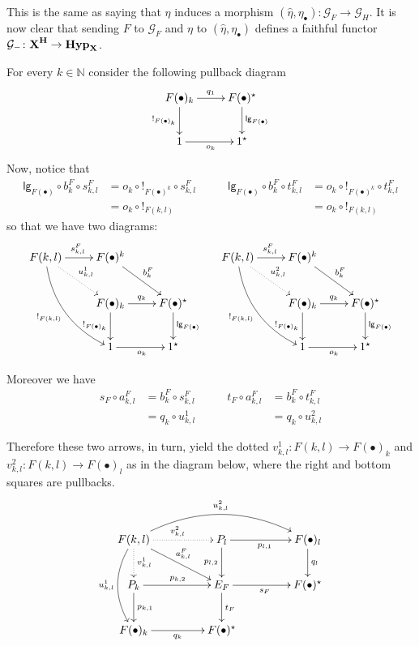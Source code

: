 \documentclass[runningheads,envcountsect]{llncs}
\newcommand{\lgh}{\mathsf{lg}}
\def\X{\textbf {\textup{X}}}
\newcommand{\catname}[1]{\textbf{\textup{#1}}}
\newcommand{\hyp}{\catname{Hyp}}
\begin{document}
This is the same as saying that $\eta$ induces a morphism $(\hat{\eta}, \eta_{\bullet})\colon \mathcal{G}_F\to \mathcal{G}_H$. It is now clear that sending $F$ to $\mathcal{G}_F$ and $\eta$ to $(\hat{\eta}, \eta_{\bullet})$ defines a faithful functor $\mathcal{G}_{-}\colon \catname{\X}^{\catname{H}}\to \hyp_\X$.

\begin{remark}\label{rem:utile}
For every $k\in \mathbb{N}$ consider the following pullback diagram	
	\[\xymatrix{F(\bullet)_k  \ar[r]^{q_1} \ar[d]_{!_{F(\bullet)_k}}& F(\bullet)^\star \ar[d]^{\lgh_{F(\bullet)}} \\ 1 \ar[r]_{o_k} & 1^\star}\]
	Now, notice that 
	\[\begin{split}
		\lgh_{F(\bullet)}\circ b^{F}_k\circ s^{F}_{k,l}&=o_{k}\circ !_{F(\bullet)^k}\circ s^F_{k,l}\\&=o_k\circ !_{F(k,l)}
	\end{split} \qquad \begin{split}
	\lgh_{F(\bullet)}\circ b^{F}_k\circ t^{F}_{k,l}&=o_{k}\circ !_{F(\bullet)^k}\circ t^F_{k,l}\\&=o_k\circ !_{F(k,l)}
	\end{split}\]
so that we have two diagrams:
	\[\xymatrix{F(k,l)\ar[r]^{s^F_{k,l}} \ar@{.>}[dr]^{u^1_{k,l}}  \ar@/_.5cm/[ddr]_{!_{F(k,l)}}&F(\bullet)^k \ar[dr]^{b^F_k}&& F(k,l) \ar@/_.5cm/[ddr]_{!_{F(k,l)}} \ar[r]^{s^F_{k,l}} \ar@{.>}[dr]^{u^2_{k,l}} &F(\bullet)^k \ar[dr]^{b^F_k}\\ & F(\bullet)_k  \ar[r]^{q_{k}} \ar[d]_{!_{F(\bullet)_k}}& F(\bullet)^\star \ar[d]^{\lgh_{F(\bullet)}} && F(\bullet)_k  \ar[r]^{q_{k} }\ar[d]_{!_{F(\bullet)_k}}& F(\bullet)^\star \ar[d]^{\lgh_{F(\bullet)}} \\ &  1 \ar[r]_{o_k} & 1^\star && 1 \ar[r]_{o_k} & 1^\star}\]
	
	Moreover we have
	\[\begin{split}
		s_F\circ a^F_{k,l}&=b^F_k\circ s^{F}_{k,l}\\&=
		q_{k}\circ u^1_{k,l}	\end{split} \qquad \begin{split}
		t_F\circ a^F_{k,l}&=b^F_k\circ t^{F}_{k,l}\\&=
		q_{k}\circ u^2_{k,l}	\end{split}  \]	
		
	Therefore these two arrows, in turn, yield the dotted $v^1_{k,l}\colon F(k,l)\to F(\bullet)_k $ and $v^2_{k,l}\colon F(k,l)\to F(\bullet)_l$ as in the diagram below, where the right and bottom squares are pullbacks.
	\[\xymatrix@C=45pt{F(k,l)  \ar[dr]^{a^F_{k,l}} \ar@{.>}[r]^{v^2_{k,l}} \ar@{.>}[d]^{v^1_{k,l}} \ar@/^.8cm/[rr]^{u^2_{k,l}} \ar@/_.5cm/[dd]_{u^1_{k,l}}& P_{l} \ar[r]_{p_{l,1}} \ar[d]_{p_{l,2}}& F(\bullet)_{l} \ar[d]^{q_{l}}\\ P_k \ar[r]^{p_{k,2}} \ar[d]^{p_{k,1}}& E_F \ar[r]_{s_F}  \ar[d]^{t_F}& F(\bullet)^\star \\ F(\bullet)_k  \ar[r]_{q_{k}}& F(\bullet)^\star}\]
	

\end{remark}
\end{document}
